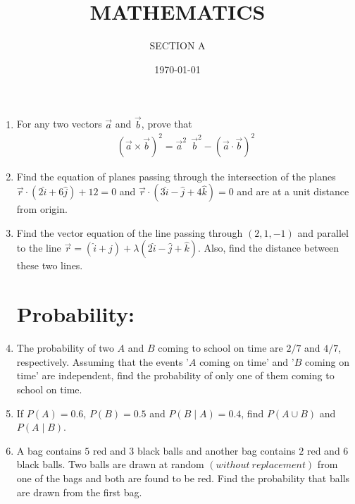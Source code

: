 \documentclass[10pt,-letter paper]{article}
\title{MATHEMATICS}
\author{SECTION A}
\date{\today}
\providecommand{\brak}[1]{\ensuremath{\left(#1\right)}}
\begin{document}
\maketitle

\begin{enumerate}

\section{Vector:}

\item For any two vectors $\overrightarrow{a}$ and $\overrightarrow{b}$, prove that
\begin{align*}
	\brak{{\overrightarrow{a} \times \overrightarrow{b}}}^{2} = {\overrightarrow{a}^{2}}~~{\overrightarrow{b}^{2}} - \brak{{\overrightarrow{a} \cdot \overrightarrow{b}}}^{2} 
\end{align*}

\item Find the equation of planes passing through the intersection  of the planes $\overrightarrow{r} \cdot \brak{2\hat{i}+6\hat{j}}+12=0$ and $\overrightarrow{r} \cdot \brak{3\hat{i}-\hat{j}+4\hat{k}}=0$ and are at a unit distance from origin.

\item Find the vector equation of the line passing through $\brak{2,1,-1}$ and parallel to the line $\overrightarrow{r}=\brak{\hat{i}+\hat{j}}+\lambda\brak{2\hat{i}-\hat{j}+\hat{k}}$. Also, find the distance between these two lines.


\section{Probability:}

\item The probability of two  $A$ and $B$ coming to school on time are $2/7$ and $4/7$, respectively. Assuming that the events '$A$ coming on time' and '$B$ coming on time' are independent, find the probability of only one of them coming to school on time.

\item If $P\brak{A}=0.6$, $P\brak{B}=0.5$ and $P\brak{B\mid A}=0.4$, find $P\brak{A\cup B}$ and $P\brak{A\mid B}$.

\item A bag contains $5$ red and $3$ black balls and another bag contains $2$ red and $6$ black balls. Two balls are drawn at random \brak{ without~replacement} from one of the bags and both are found to be red. Find the probability that balls are drawn from the first bag.


\end{enumerate}
\end{document}
